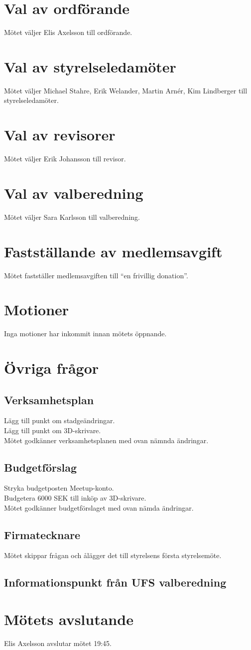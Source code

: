 \documentclass[a4paper,11pt,oneside]{article}
\begin{document}
\section{Val av ordförande}
Mötet väljer Elis Axelsson till ordförande.

\section{Val av styrelseledamöter}
Mötet väljer Michael Stahre, Erik Welander, Martin Arnér, Kim Lindberger till styrelseledamöter.

\section{Val av revisorer}
Mötet väljer Erik Johansson till revisor.

\section{Val av valberedning}
Mötet väljer Sara Karlsson till valberedning.

\section{Fastställande av medlemsavgift}
Mötet fastställer medlemsavgiften till ``en frivillig donation''.

\section{Motioner}
Inga motioner har inkommit innan mötets öppnande.

\section{Övriga frågor}
\subsection{Verksamhetsplan}
Lägg till punkt om stadgeändringar. \\
Lägg till punkt om 3D-skrivare. \\
Mötet godkänner verksamhetsplanen med ovan nämnda ändringar.

\subsection{Budgetförslag}
Stryka budgetposten Meetup-konto. \\
Budgetera 6000 SEK till inköp av 3D-skrivare. \\
Mötet godkänner budgetförslaget med ovan nämda ändringar.

\subsection{Firmatecknare}
Mötet skippar frågan och ålägger det till styrelsens första styrelsemöte.

\subsection{Informationspunkt från UFS valberedning}

\section{Mötets avslutande}
Elis Axelsson avslutar mötet 19:45.
\end{document}
